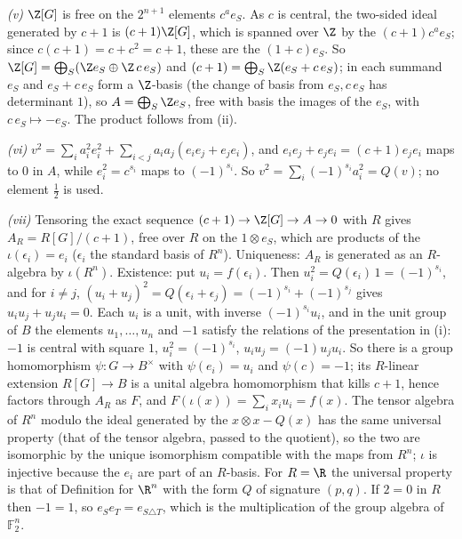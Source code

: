 \emph{(v)} $\Z[G]$ is free on the $2^{n+1}$ elements $c^{a}e_{S}$. As $c$ is central, the two-sided ideal generated by $c + 1$ is $(c + 1)\Z[G]$, which is spanned over $\Z$ by the $(c + 1)c^{a}e_{S}$; since $c(c + 1) = c + c^{2} = c + 1$, these are the $(1 + c)e_{S}$. So $\Z[G] = \bigoplus_{S}(\Z e_{S} \oplus \Z\,c\,e_{S})$ and $(c + 1) = \bigoplus_{S}\Z(e_{S} + c\,e_{S})$; in each summand $e_{S}$ and $e_{S} + c\,e_{S}$ form a $\Z$-basis (the change of basis from $e_{S}, c\,e_{S}$ has determinant $1$), so $A = \bigoplus_{S}\Z e_{S}$, free with basis the images of the $e_{S}$, with $c\,e_{S} \mapsto -e_{S}$. The product follows from (ii).

\emph{(vi)} $v^{2} = \sum_{i}a_{i}^{2}e_{i}^{2} + \sum_{i < j}a_{i}a_{j}(e_{i}e_{j} + e_{j}e_{i})$, and $e_{i}e_{j} + e_{j}e_{i} = (c + 1)e_{j}e_{i}$ maps to $0$ in $A$, while $e_{i}^{2} = c^{s_{i}}$ maps to $(-1)^{s_{i}}$. So $v^{2} = \sum_{i}(-1)^{s_{i}}a_{i}^{2} = Q(v)$; no element $\tfrac12$ is used.

\emph{(vii)} Tensoring the exact sequence $(c + 1) \to \Z[G] \to A \to 0$ with $R$ gives $A_{R} = R[G]/(c + 1)$, free over $R$ on the $1 \otimes e_{S}$, which are products of the $\iota(\epsilon_{i}) = e_{i}$ ($\epsilon_{i}$ the standard basis of $R^{n}$). Uniqueness: $A_{R}$ is generated as an $R$-algebra by $\iota(R^{n})$. Existence: put $u_{i} = f(\epsilon_{i})$. Then $u_{i}^{2} = Q(\epsilon_{i})\,1 = (-1)^{s_{i}}$, and for $i \ne j$, $(u_{i} + u_{j})^{2} = Q(\epsilon_{i} + \epsilon_{j}) = (-1)^{s_{i}} + (-1)^{s_{j}}$ gives $u_{i}u_{j} + u_{j}u_{i} = 0$. Each $u_{i}$ is a unit, with inverse $(-1)^{s_{i}}u_{i}$, and in the unit group of $B$ the elements $u_{1}, \dots, u_{n}$ and $-1$ satisfy the relations of the presentation in (i): $-1$ is central with square $1$, $u_{i}^{2} = (-1)^{s_{i}}$, $u_{i}u_{j} = (-1)u_{j}u_{i}$. So there is a group homomorphism $\psi : G \to B^{\times}$ with $\psi(e_{i}) = u_{i}$ and $\psi(c) = -1$; its $R$-linear extension $R[G] \to B$ is a unital algebra homomorphism that kills $c + 1$, hence factors through $A_{R}$ as $F$, and $F(\iota(x)) = \sum_{i}x_{i}u_{i} = f(x)$. The tensor algebra of $R^{n}$ modulo the ideal generated by the $x \otimes x - Q(x)$ has the same universal property (that of the tensor algebra, passed to the quotient), so the two are isomorphic by the unique isomorphism compatible with the maps from $R^{n}$; $\iota$ is injective because the $e_{i}$ are part of an $R$-basis. For $R = \R$ the universal property is that of Definition  for $\R^{n}$ with the form $Q$ of signature $(p, q)$. If $2 = 0$ in $R$ then $-1 = 1$, so $e_{S}e_{T} = e_{S \triangle T}$, which is the multiplication of the group algebra of $\mathbb{F}_{2}^{n}$.

